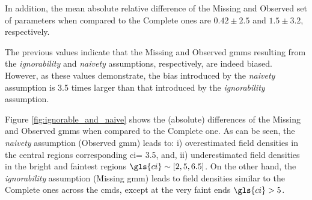 In addition, the mean absolute relative difference of the Missing and Observed set of parameters when compared to the Complete ones are $0.42 \pm 2.5$ and $1.5 \pm 3.2$, respectively.  

The previous values indicate that the Missing and Observed \glspl{gmm} resulting from the \emph{ignorability} and \emph{naivety} assumptions, respectively, are indeed biased. However, as these values demonstrate, the bias introduced by the \emph{naivety} assumption is 3.5 times larger than that introduced by the \emph{ignorability} assumption. 

Figure \ref{fig:ignorable_and_naive} shows the (absolute) differences of the Missing and Observed \glspl{gmm} when compared to the Complete one. As can be seen, the \emph{naivety} assumption (Observed \gls{gmm}) leads to: i) overestimated field densities in the central regions corresponding \gls{ci}= 3.5, and, ii) underestimated field densities in the bright and faintest regions  $\gls{ci}\sim[2,5,6.5]$. On the other hand, the \emph{ignorability} assumption (Missing \gls{gmm}) leads to field densities similar to the Complete ones across the \glspl{cmd}, except at the very faint ends $\gls{ci}>5$.


